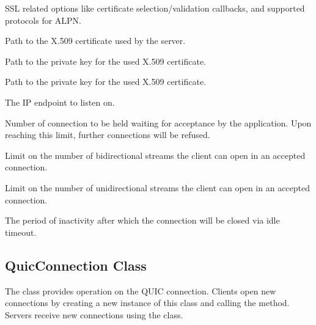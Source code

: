 \begin{description}

     SSL
related options like certificate selection/validation callbacks, and supported protocols for ALPN\@.

     Path to the X.509 certificate
used by the server.

     Path to the private key for
the used X.509 certificate.

     Path to the private key for
the used X.509 certificate.

     The IP endpoint to listen on.

     Number of connection to be held
waiting for acceptance by the application. Upon reaching this limit, further connections will be
refused.

     Limit on the number of
bidirectional streams the client can open in an accepted connection.

     Limit on the number of
unidirectional streams the client can open in an accepted connection.

     The period of inactivity after which the
connection will be closed via idle timeout.

\end{description}

\subsection{QuicConnection Class}

The \QuicConnection{} class provides operation on the QUIC connection. Clients open new connections
by creating a new instance of this class and calling the  method. Servers
receive new connections using the  class.


